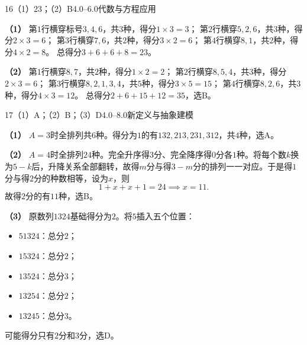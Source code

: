 
\begin{solution}{16}{（1）23；（2）B}{4.0--6.0}{代数与方程应用}

\textbf{（1）}
第\(1\)行横穿标号\(3,4,6\)，共\(3\)种，得分\(1\times3=3\)；
第\(2\)行横穿\(5,2,6\)，共\(3\)种，得分\(2\times3=6\)；
第\(3\)行横穿\(7,6\)，共\(2\)种，得分\(3\times2=6\)；
第\(4\)行横穿\(8,1\)，共\(2\)种，得分\(4\times2=8\)。
总得分\(3+6+6+8=23\)。

\textbf{（2）}
第\(1\)行横穿\(8,7\)，共\(2\)种，得分\(1\times2=2\)；
第\(2\)行横穿\(8,5,4\)，共\(3\)种，得分\(2\times3=6\)；
第\(3\)行横穿\(8,2,1,3,4\)，共\(5\)种，得分\(3\times5=15\)；
第\(4\)行横穿\(8,2,6\)，共\(3\)种，得分\(4\times3=12\)。
总得分\(2+6+15+12=35\)，选B。

\end{solution}

\begin{solution}{17}{（1）A；（2）B；（3）D}{4.0--8.0}{新定义与抽象建模}

\textbf{（1）}
\(A=3\)时全排列共\(6\)种。得分为\(1\)的有\(132,213,231,312\)，共\(4\)种，选A。

\textbf{（2）}
\(A=4\)时全排列\(24\)种。完全升序得\(3\)分、完全降序得\(0\)分各\(1\)种。将每个数\(k\)换为\(5-k\)后，升降关系全部翻转，故得\(m\)分与得\(3-m\)分的排列一一对应。于是得\(1\)分与得\(2\)分的种数相等，设为\(x\)，则
\[
1+x+x+1=24\implies x=11.
\]
故得\(2\)分的有\(11\)种，选B。

\textbf{（3）}
原数列\(1324\)基础得分为\(2\)。将\(5\)插入五个位置：
\begin{itemize}[leftmargin=*]
  \item \(51324\)：总分\(2\)；
  \item \(15324\)：总分\(2\)；
  \item \(13524\)：总分\(3\)；
  \item \(13254\)：总分\(2\)；
  \item \(13245\)：总分\(3\)。
\end{itemize}
可能得分只有\(2\)分和\(3\)分，选D。

\end{solution}

